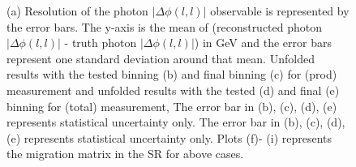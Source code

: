 \begin{figure}[ht]
    \hfill
    \hfill
    \hfill
    \hfill

    \caption{(a) Resolution of the photon $|\Delta \phi(l,l)|$ observable is represented by the error bars. The y-axis
    is the mean of (reconstructed photon $|\Delta \phi(l,l)|$ - truth photon $|\Delta \phi(l,l)|$) in GeV and the error bars represent
    one standard deviation around that mean.
    Unfolded results with the tested binning (b) and final
    binning (c) for \tty(prod) measurement and unfolded results with the tested
    (d) and final (e) binning for \tty(total) measurement, The error bar in (b),
    (c), (d), (e) represents statistical uncertainty only.
    The error bar in (b), (c), (d), (e) represents statistical uncertainty only.
    Plots (f)- (i) represents the migration matrix in the SR for above cases.}
\end{figure}
\FloatBarrier

